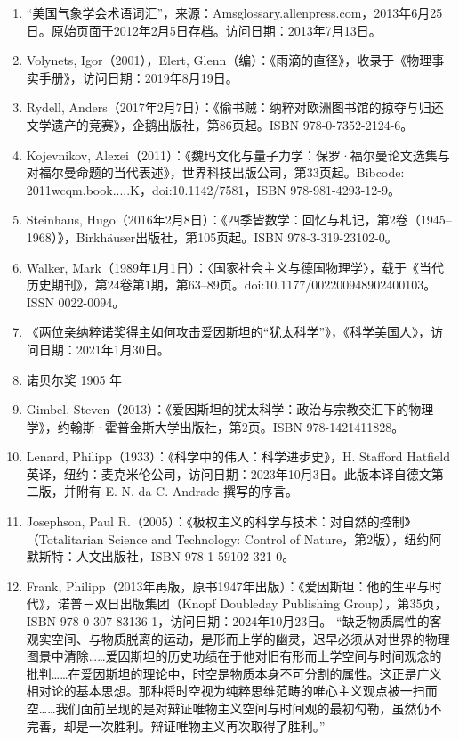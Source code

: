 \begin{enumerate}
\item “美国气象学会术语词汇”，来源：Amsglossary.allenpress.com，2013年6月25日。原始页面于2012年2月5日存档。访问日期：2013年7月13日。
\item Volynets, Igor（2001），Elert, Glenn（编）：《雨滴的直径》，收录于《物理事实手册》，访问日期：2019年8月19日。
\item Rydell, Anders（2017年2月7日）：《偷书贼：纳粹对欧洲图书馆的掠夺与归还文学遗产的竞赛》，企鹅出版社，第86页起。ISBN 978-0-7352-2124-6。
\item Kojevnikov, Alexei（2011）：《魏玛文化与量子力学：保罗·福尔曼论文选集与对福尔曼命题的当代表述》，世界科技出版公司，第33页起。Bibcode: 2011wcqm.book.....K，doi:10.1142/7581，ISBN 978-981-4293-12-9。
\item Steinhaus, Hugo（2016年2月8日）：《四季皆数学：回忆与札记，第2卷（1945–1968）》，Birkhäuser出版社，第105页起。ISBN 978-3-319-23102-0。
\item Walker, Mark（1989年1月1日）：〈国家社会主义与德国物理学〉，载于《当代历史期刊》，第24卷第1期，第63–89页。doi:10.1177/002200948902400103。ISSN 0022-0094。
\item 《两位亲纳粹诺奖得主如何攻击爱因斯坦的“犹太科学”》，《科学美国人》，访问日期：2021年1月30日。
\item 诺贝尔奖 1905 年
\item Gimbel, Steven（2013）：《爱因斯坦的犹太科学：政治与宗教交汇下的物理学》，约翰斯·霍普金斯大学出版社，第2页。ISBN 978-1421411828。
\item Lenard, Philipp（1933）：《科学中的伟人：科学进步史》，H. Stafford Hatfield 英译，纽约：麦克米伦公司，访问日期：2023年10月3日。此版本译自德文第二版，并附有 E. N. da C. Andrade 撰写的序言。
\item Josephson, Paul R.（2005）：《极权主义的科学与技术：对自然的控制》（Totalitarian Science and Technology: Control of Nature，第2版），纽约阿默斯特：人文出版社，ISBN 978-1-59102-321-0。
\item Frank, Philipp（2013年再版，原书1947年出版）：《爱因斯坦：他的生平与时代》，诺普－双日出版集团（Knopf Doubleday Publishing Group），第35页，ISBN 978-0-307-83136-1，访问日期：2024年10月23日。
 “缺乏物质属性的客观实空间、与物质脱离的运动，是形而上学的幽灵，迟早必须从对世界的物理图景中清除……爱因斯坦的历史功绩在于他对旧有形而上学空间与时间观念的批判……在爱因斯坦的理论中，时空是物质本身不可分割的属性。这正是广义相对论的基本思想。那种将时空视为纯粹思维范畴的唯心主义观点被一扫而空……我们面前呈现的是对辩证唯物主义空间与时间观的最初勾勒，虽然仍不完善，却是一次胜利。辩证唯物主义再次取得了胜利。”

\end{enumerate}
